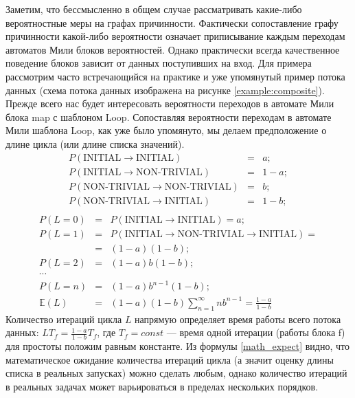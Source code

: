 \documentclass[10pt,a4paper]{article}
\newcommand{\initial}{\text{INITIAL}}
\newcommand{\nontrivial}{\text{NON-TRIVIAL}}
\begin{document}
  Заметим, что бессмысленно в общем случае рассматривать какие-либо вероятностные меры на графах причинности. Фактически сопоставление графу причинности
  какой-либо вероятности означает приписывание каждым переходам автоматов Мили блоков вероятностей. Однако практически всегда качественное поведение блоков зависит
  от данных поступивших на вход. Для примера рассмотрим часто встречающийся на практике и уже упомянутый пример потока данных
  (схема потока данных изображена на рисунке \ref{example:composite}). Прежде всего нас будет интересовать вероятности переходов в автомате Мили блока map с шаблоном Loop.
  Сопоставляя вероятности переходам в автомате Мили шаблона Loop, как уже было упомянуто, мы делаем предположение о длине цикла (или длине списка значений).
  \begin{eqnarray*}
    P(\initial \rightarrow \initial) & = & a; \\
    P(\initial \rightarrow \nontrivial) & = & 1 - a; \\
    P(\nontrivial \rightarrow \nontrivial) & = & b; \\
    P(\nontrivial \rightarrow \initial) & = & 1 - b; \\
  \end{eqnarray*}
  \begin{eqnarray*}  
    P(L = 0) & = & P(\initial \rightarrow \initial) = a; \\
    P(L = 1) & = & P(\initial \rightarrow \nontrivial \rightarrow \initial) = \\
             & = & (1 - a) (1 - b); \\
    P(L = 2) & = & (1 - a) b (1 - b); \\
    \cdots & & \\
    P(L = n) & = & (1 - a) b^{n - 1} (1 - b);\\
    \mathbb{E}(L) & = & (1 - a) (1 - b) \sum^{\infty}_{n = 1} n b^{n - 1} = \frac{1 - a}{1 - b} \label{math_expect}
  \end{eqnarray*}
  Количество итераций цикла $L$ напрямую определяет время работы всего потока данных: $LT_f = \frac{1 - a}{1 - b} T_f$,
  где $T_f = const$ --- время одной итерации (работы блока f) для простоты положим равным константе.
  Из формулы \ref{math_expect} видно, что математическое ожидание количества итераций цикла
  (а значит оценку длины списка в реальных запусках) можно сделать любым, однако количество итераций в реальных задачах может варьироваться в пределах нескольких порядков.
  
\end{document}
